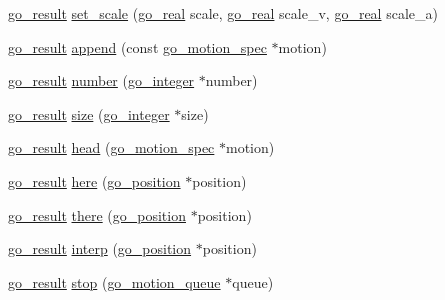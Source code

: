 \begin{DoxyCompactItemize}
\item 
\hyperlink{gotypes_8h_a55d48b38cd959f63c7e8db8337a9792a}{go\-\_\-result} \hyperlink{structgomotion_1_1go__motion__queue_addfc802fee86a93050de27d185c4030b}{set\-\_\-scale} (\hyperlink{gotypes_8h_afd666a2393eebd71ee455846ac9def9b}{go\-\_\-real} scale, \hyperlink{gotypes_8h_afd666a2393eebd71ee455846ac9def9b}{go\-\_\-real} scale\-\_\-v, \hyperlink{gotypes_8h_afd666a2393eebd71ee455846ac9def9b}{go\-\_\-real} scale\-\_\-a)
\item 
\hyperlink{gotypes_8h_a55d48b38cd959f63c7e8db8337a9792a}{go\-\_\-result} \hyperlink{structgomotion_1_1go__motion__queue_aed6b10eacd99af71b2b0cf69d6ddebeb}{append} (const \hyperlink{structgomotion_1_1go__motion__spec}{go\-\_\-motion\-\_\-spec} $\ast$motion)
\item 
\hyperlink{gotypes_8h_a55d48b38cd959f63c7e8db8337a9792a}{go\-\_\-result} \hyperlink{structgomotion_1_1go__motion__queue_a8dfbc19656f2dfcf1e99c27e6a909c4d}{number} (\hyperlink{gotypes_8h_a7d30f606bb0f58ffe2b3bd71e5c8af5c}{go\-\_\-integer} $\ast$number)
\item 
\hyperlink{gotypes_8h_a55d48b38cd959f63c7e8db8337a9792a}{go\-\_\-result} \hyperlink{structgomotion_1_1go__motion__queue_a9eb929528abd0d19d272110c67236dce}{size} (\hyperlink{gotypes_8h_a7d30f606bb0f58ffe2b3bd71e5c8af5c}{go\-\_\-integer} $\ast$size)
\item 
\hyperlink{gotypes_8h_a55d48b38cd959f63c7e8db8337a9792a}{go\-\_\-result} \hyperlink{structgomotion_1_1go__motion__queue_a3fe40223c4ad5a19b929b192d7cead64}{head} (\hyperlink{structgomotion_1_1go__motion__spec}{go\-\_\-motion\-\_\-spec} $\ast$motion)
\item 
\hyperlink{gotypes_8h_a55d48b38cd959f63c7e8db8337a9792a}{go\-\_\-result} \hyperlink{structgomotion_1_1go__motion__queue_ab45a3644aac5d496e758db38a3553037}{here} (\hyperlink{structgomotion_1_1go__position}{go\-\_\-position} $\ast$position)
\item 
\hyperlink{gotypes_8h_a55d48b38cd959f63c7e8db8337a9792a}{go\-\_\-result} \hyperlink{structgomotion_1_1go__motion__queue_ad5de56ac17a7e86ea66627376b668bd2}{there} (\hyperlink{structgomotion_1_1go__position}{go\-\_\-position} $\ast$position)
\item 
\hyperlink{gotypes_8h_a55d48b38cd959f63c7e8db8337a9792a}{go\-\_\-result} \hyperlink{structgomotion_1_1go__motion__queue_a3cfb410e307b2bd3af0c64406364edfc}{interp} (\hyperlink{structgomotion_1_1go__position}{go\-\_\-position} $\ast$position)
\item 
\hyperlink{gotypes_8h_a55d48b38cd959f63c7e8db8337a9792a}{go\-\_\-result} \hyperlink{structgomotion_1_1go__motion__queue_a59932f32a219889d188e2b4184b396c2}{stop} (\hyperlink{structgomotion_1_1go__motion__queue}{go\-\_\-motion\-\_\-queue} $\ast$queue)

\end{DoxyCompactItemize}
